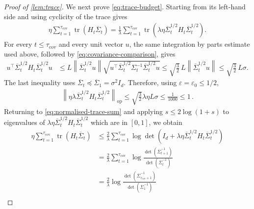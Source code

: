\documentclass[11pt]{article}
\newcommand{\tr}{\operatorname{tr}}
\newcommand{\op}{\mathrm{op}}
\newcommand{\1}{\mathbf 1}
\newcommand{\eps}{\varepsilon}
\newcommand{\norm}[1]{\left\lVert #1\right\rVert}
\begin{document}
\begin{proof}[Proof of \cref{lem:trace}]
    We next prove \eqref{eq:trace-budget}.  Starting from its left-hand side
    and using cyclicity of the trace gives
    \begin{align}
        \eta\sum_{t=1}^{\tau_{\mathrm{cov}}}
        \tr(H_t\overline\Sigma_t)
        =
        \frac1\lambda\sum_{t=1}^{\tau_{\mathrm{cov}}}
        \tr\left(
        \lambda\eta\overline\Sigma_t^{1/2}H_t
        \overline\Sigma_t^{1/2}
        \right).
        \label{eq:normalised-trace-sum}
    \end{align}
    For every $t\leq\tau_{\mathrm{cov}}$ and every unit vector $u$, the same integration by
    parts estimate used above, followed by
    \eqref{eq:covariance-comparison}, gives
    \begin{align}
        u^\top\overline\Sigma_t^{1/2}H_t
        \overline\Sigma_t^{1/2}u
         & \leq
        L\norm{\overline\Sigma_t^{1/2}u}
        \sqrt{u^\top\overline\Sigma_t^{1/2}
            \Sigma_t^{-1}\overline\Sigma_t^{1/2}u}
        \leq
        \sqrt{\frac32}\,L
        \norm{\overline\Sigma_t^{1/2}u}
        \leq
        \sqrt{\frac32}\,L\sigma.
        \label{eq:normalised-H}
    \end{align}
    The last inequality uses
    $\overline\Sigma_t\preceq\overline\Sigma_1=\sigma^2I_d$.
    Therefore, using $\eps=\eps_0\leq1/2$,
    \begin{align}
        \norm{\eta\lambda\overline\Sigma_t^{1/2}H_t\overline\Sigma_t^{1/2}}_{\op}
        \leq
        \sqrt{\frac32}\lambda\eta L\sigma
        \leq
        \frac1{1000}
        \leq
        1\,.
    \end{align}
    Returning to
    \eqref{eq:normalised-trace-sum} and applying
    $s\leq2\log(1+s)$ to eigenvalues of $\lambda\eta\overline\Sigma_t^{1/2}H_t\overline\Sigma_t^{1/2}$
    which are in $[0,1]$, we obtain
    \begin{align}
        \eta\sum_{t=1}^{\tau_{\mathrm{cov}}}
        \tr(H_t\overline\Sigma_t)
         & \leq
        \frac2\lambda\sum_{t=1}^{\tau_{\mathrm{cov}}}
        \log\det\left(
        I_d+\lambda\eta\overline\Sigma_t^{1/2}H_t
        \overline\Sigma_t^{1/2}
        \right)                        \\
         & =
        \frac2\lambda\sum_{t=1}^{\tau_{\mathrm{cov}}}
        \log\frac{\det(\overline\Sigma_{t+1}^{-1})}
        {\det(\overline\Sigma_t^{-1})} \\
         & =
        \frac2\lambda
        \log\frac{\det(\overline\Sigma_{\tau_{\mathrm{cov}}+1}^{-1})}
        {\det(\overline\Sigma_1^{-1})} \\

\end{align}
\end{proof}
\end{document}
